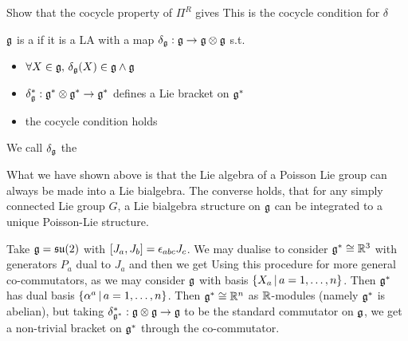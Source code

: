 \documentclass{article}
\begin{document}
\begin{ex}
Show that the cocycle property of $\Pi^R$ gives 
This is the cocycle condition for $\delta$
\end{ex}

\begin{definition}
$\mf{g}$ is a  if it is a LA with a map $\delta_{\mf{g}} : \mf{g} \to \mf{g} \otimes \mf{g}$ s.t. 
\begin{itemize}
    \item $\forall X \in \mf{g}, \, \delta_{\mf{g}}(X) \in \mf{g} \wedge \mf{g}$ 
    \item $\delta_{\mf{g}}^\ast : \mf{g}^\ast \otimes \mf{g}^\ast \to \mf{g}^\ast$ defines a Lie bracket on $\mf{g}^\ast$ 
    \item the cocycle condition holds
\end{itemize}
We call $\delta_{\mf{g}}$ the 
\end{definition}

\begin{remark}
What we have shown above is that the Lie algebra of a Poisson Lie group can always be made into a Lie bialgebra. The converse holds, that for any simply connected Lie group $G$, a Lie bialgebra structure on $\mf{g}$ can be integrated to a unique Poisson-Lie structure. 
\end{remark}

\begin{example}
Take $\mf{g} = \mf{su}(2)$ with $\comm[J_a]{J_b} = \eps_{abc}J_c$. We may dualise to consider $\mf{g}^\ast \cong \mbb{R}^3$ with generators $P_a$ dual to $J_a$ and then we get 
Using this procedure for more general co-commutators, as we may consider $\mf{g}$ with basis $\pbrace{X_a \, | \, a=1, \dots, n}$. Then $\mf{g}^\ast$ has dual basis $\pbrace{\alpha^a \, | \, a=1, \dots, n}$. Then $\mf{g}^\ast\cong\mbb{R}^n$ as $\mbb{R}$-modules (namely $\mf{g}^\ast$ is abelian), but taking $\delta_{\mf{g}^\ast}^\ast : \mf{g} \otimes \mf{g} \to \mf{g}$ to be the standard commutator on $\mf{g}$, we get a non-trivial bracket on $\mf{g}^\ast$ through the co-commutator. 
\end{example}
\end{document}
